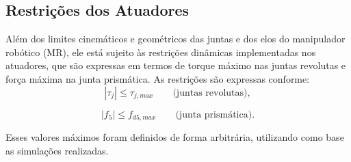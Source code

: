 \subsection{Restrições dos Atuadores}

Além dos limites cinemáticos e geométricos das juntas e dos elos do manipulador robótico (MR), ele está sujeito às restrições dinâmicas implementadas nos atuadores, que são expressas em termos de torque máximo nas juntas revolutas e força máxima na junta prismática.  
As restrições são expressas conforme:
\begin{equation}
\label{eq:limite_torque}
|\tau_j| \leq \tau_{j,max} \qquad \text{(juntas revolutas)},
\end{equation}

\begin{equation}
\label{eq:limite_forca}
|f_5| \leq f_{d5,max} \qquad \text{(junta prismática)}.
\end{equation}


Esses valores máximos foram definidos de forma arbitrária, utilizando como base as simulações realizadas.

